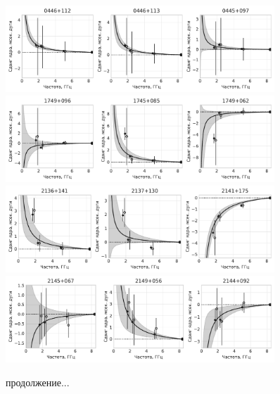 \addtocounter{figure}{-1}
\begin{figure}
 \centering
 \includegraphics[width=0.9\textwidth]{freqdep/4}
 \includegraphics[width=0.9\textwidth]{freqdep/5}
 \includegraphics[width=0.9\textwidth]{freqdep/6}
 \includegraphics[width=0.9\textwidth]{freqdep/7}
 \caption{продолжение...}
\end{figure}


